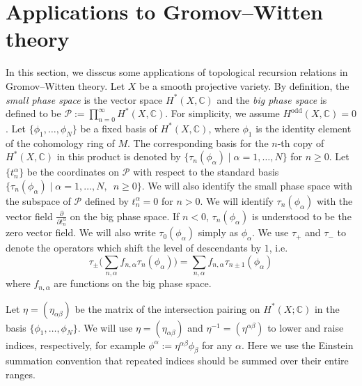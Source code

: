 \documentclass[12pt,reqno]{amsart}
\theoremstyle{plain}
\theoremstyle{definition}
\theoremstyle{remark}
\begin{document}
\section{Applications to Gromov--Witten theory}
\label{sec:app-gw}

In this section, we disscus some applications of topological recursion relations in Gromov--Witten theory.
Let $X$ be a smooth projective variety.
By definition, the {\it small phase space} is the vector space $H^{*}(X,\mathbb{C})$ and the {\it big phase space} is defined to be
$\mathcal{P}:=\prod_{n=0}^{\infty} H^{*}(X,\mathbb{C})$.
For simplicity, we assume $H^{\text{odd}}(X,\mathbb{C})=0$.
Let $\{\phi_{1},\dots,\phi_{N}\}$ be a fixed basis of $H^{*}(X,\mathbb{C})$, where $\phi_{1}$
is the identity element of the cohomology ring of $M$.
The  corresponding
basis for the $n$-th copy of $H^{*}(X,\mathbb{C})$ in this product is denoted by
$\{ \tau_{n}(\phi_\alpha) \mid \alpha=1, \ldots, N\}$ for $ n \geq 0$.
Let $\{t_{n}^{\alpha}\}$ be the coordinates on $\mathcal{P}$
with respect to the standard basis $\{ \tau_{n}(\phi_\alpha) \mid \alpha=1, \ldots, N, \,\,\, n \geq 0\}$.
 We will also identify the small phase space with
the subspace of $\mathcal{P}$ defined by $t_n^{\alpha}=0$ for $n>0$.
%
%
%
We will identify $\tau_{n}(\phi_{\alpha})$ with the vector field $\frac{\partial}{\partial t_{n}^{\alpha}}$ on the big phase space.
If $n<0$, $\tau_{n}(\phi_{\alpha})$ is understood to be the zero vector field.
We will also write $\tau_{0}(\phi_{\alpha})$ simply as $\phi_{\alpha}$.
We use $\tau_{+}$ and $\tau_{-}$ to denote the operators which shift the level of descendants by $1$, i.e.
$$\tau_{\pm}\Big(\sum_{n,\alpha}f_{n,\alpha}\tau_{n}(\phi_{\alpha})\Big)
=\sum_{n,\alpha}f_{n,\alpha}\tau_{n\pm1}(\phi_{\alpha})$$ where $f_{n,\alpha}$ are functions on the big phase space.

Let $\eta=(\eta_{\alpha\beta})$ be the matrix of the intersection pairing on $H^{*}(X;\mathbb{C})$  in the basis $\{\phi_{1},\dots,\phi_{N}\}$.
We will use
$\eta=(\eta_{\alpha\beta})$ and $\eta^{-1}=(\eta^{\alpha\beta})$ to lower and  raise indices, respectively, for example $\phi^{\alpha}:=\eta^{\alpha\beta}\phi_{\beta}$ for any $\alpha$.
Here we use the Einstein summation convention that repeated indices should be summed over their entire ranges.
\end{document}
